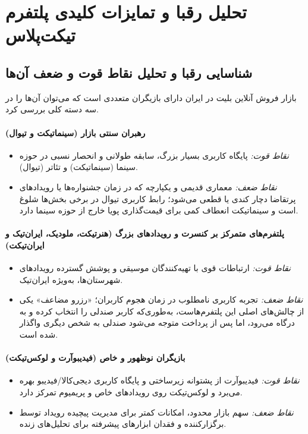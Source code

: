 \documentclass[12pt,a4paper]{article}
\begin{document}
\section{تحلیل رقبا و تمایزات کلیدی پلتفرم تیکت‌پلاس}

\subsection{شناسایی رقبا و تحلیل نقاط قوت و ضعف آن‌ها}
بازار فروش آنلاین بلیت در ایران دارای بازیگران متعددی است که می‌توان آن‌ها را
در سه دسته کلی بررسی کرد.

\paragraph{رهبران سنتی بازار (سینماتیکت و تیوال)}
\begin{itemize}
  \item \textit{نقاط قوت:} پایگاه کاربری بسیار بزرگ، سابقه طولانی و انحصار
  نسبی در حوزه سینما (سینماتیکت) و تئاتر (تیوال).
  \item \textit{نقاط ضعف:} معماری قدیمی و یکپارچه که در زمان جشنواره‌ها یا
  رویدادهای پرتقاضا دچار کندی یا قطعی می‌شود؛ رابط کاربری تیوال در برخی
  بخش‌ها شلوغ است و سینماتیکت انعطاف کمی برای قیمت‌گذاری پویا خارج از حوزه
  سینما دارد.
\end{itemize}

\paragraph{پلتفرم‌های متمرکز بر کنسرت و رویدادهای بزرگ (هنرتیکت، ملودیک،
ایران‌تیک و ایران‌تیکت)}
\begin{itemize}
  \item \textit{نقاط قوت:} ارتباطات قوی با تهیه‌کنندگان موسیقی و پوشش
  گسترده رویدادهای شهرستان‌ها، به‌ویژه ایران‌تیک.
  \item \textit{نقاط ضعف:} تجربه کاربری نامطلوب در زمان هجوم کاربران؛
  «رزرو مضاعف» یکی از چالش‌های اصلی این پلتفرم‌هاست، به‌طوری‌که کاربر صندلی
  را انتخاب کرده و به درگاه می‌رود، اما پس از پرداخت متوجه می‌شود صندلی به
  شخص دیگری واگذار شده است.
\end{itemize}

\paragraph{بازیگران نوظهور و خاص (فیدیبوآرت و لوکس‌تیکت)}
\begin{itemize}
  \item \textit{نقاط قوت:} فیدیبوآرت از پشتوانه زیرساختی و پایگاه کاربری
  دیجی‌کالا/فیدیبو بهره می‌برد و لوکس‌تیکت روی رویدادهای خاص و پریمیوم تمرکز
  دارد.
  \item \textit{نقاط ضعف:} سهم بازار محدود، امکانات کمتر برای مدیریت پیچیده
  رویداد توسط برگزارکننده و فقدان ابزارهای پیشرفته برای تحلیل‌های زنده.
\end{itemize}
\end{document}
